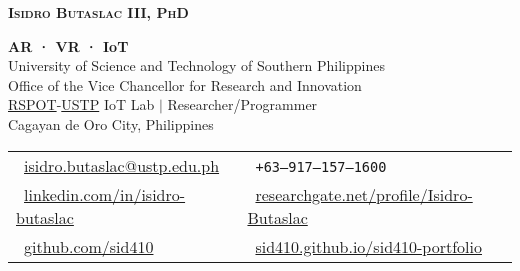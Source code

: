 \documentclass[letterpaper,11pt]{article}
\begin{document}

{\LARGE \scshape \textbf{Isidro Butaslac III, PhD}} \\

\begin{adjustwidth}{0.3cm}{0cm}

	{\textbf{AR · VR · IoT}} \\
	{University of Science and Technology of Southern Philippines} \\
	{Office of the Vice Chancellor for Research and Innovation} \\
	{\href{https://www.rspotsolutions.com/}{RSPOT}-\href{https://www.ustp.edu.ph/}{USTP} IoT Lab $|$ Researcher/Programmer} \\
	{Cagayan de Oro City, Philippines} \\

	\vspace{3pt}

	\begin{tabular}{@{} l l}
		{\faEnvelope\ \footnotesize\href{mailto:isidro.butaslac@ustp.edu.ph}{isidro.butaslac@ustp.edu.ph} }               &
		{\faPhone\ \footnotesize\texttt{+63--917--157--1600}}                                                                                                         \\

		{\faLinkedin\ \footnotesize\href{https://www.linkedin.com/in/isidro-butaslac/}{linkedin.com/in/isidro-butaslac} } &
		{\resizebox{4mm}{!}{{\faResearchgate}}\ \footnotesize\href{https://www.researchgate.net/profile/Isidro-Butaslac/}{researchgate.net/profile/Isidro-Butaslac} } \\

		{\faGithub\ \footnotesize\href{https://github.com/sid410}{github.com/sid410} }                                    &
		{\faBriefcase\ \footnotesize\href{https://sid410.github.io/sid410-portfolio/}{sid410.github.io/sid410-portfolio} }                                            \\
	\end{tabular}

\end{adjustwidth}
\end{document}
